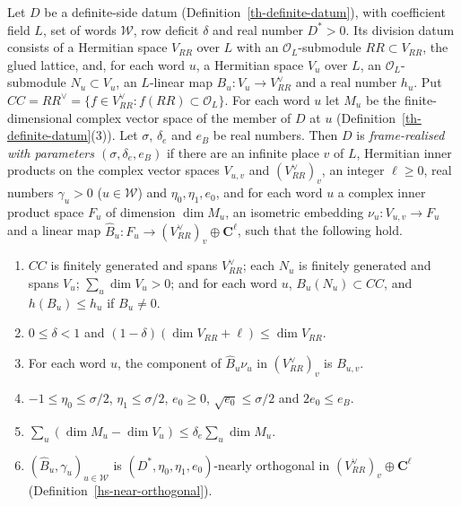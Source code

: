 \begin{definition}\label{hs-frame-realisation}
Let $D$ be a definite-side datum (Definition~\ref{th-definite-datum}), with coefficient field
$L$, set of words $\mathcal W$, row deficit $\delta$ and real number $D^*>0$. Its division
datum consists of a Hermitian space $V_{RR}$ over $L$ with an $\mathcal O_L$-submodule
$RR\subset V_{RR}$, the glued lattice, and, for each word $u$, a Hermitian space $V_u$ over $L$,
an $\mathcal O_L$-submodule $N_u\subset V_u$, an $L$-linear map $B_u:V_u\to V_{RR}^\vee$ and a
real number $h_u$. Put $CC=RR^\vee=\{f\in V_{RR}^\vee:f(RR)\subset\mathcal O_L\}$. For each word
$u$ let $M_u$ be the finite-dimensional complex vector space of the member of $D$ at $u$
(Definition~\ref{th-definite-datum}(3)). Let $\sigma$, $\delta_e$ and $e_B$ be real numbers. Then $D$ is
\emph{frame-realised with parameters $(\sigma,\delta_e,e_B)$} if there are an infinite place $v$
of $L$, Hermitian inner products on the complex vector spaces $V_{u,v}$ and $(V_{RR}^\vee)_v$, an
integer $\ell\geq0$, real numbers $\gamma_u>0$ ($u\in\mathcal W$) and $\eta_0,\eta_1,e_0$, and for
each word $u$ a complex inner product space $F_u$ of dimension $\dim M_u$, an isometric
embedding $\nu_u:V_{u,v}\to F_u$ and a linear map
$\hat B_u:F_u\to(V_{RR}^\vee)_v\oplus\mathbf C^\ell$, such that the following hold.
\begin{enumerate}
\item $CC$ is finitely generated and spans $V_{RR}^\vee$; each $N_u$ is finitely generated
  and spans $V_u$; $\sum_u\dim V_u>0$; and for each word $u$, $B_u(N_u)\subset CC$, and $h(B_u)\leq h_u$ if
  $B_u\neq0$.
\item $0\leq\delta<1$ and $(1-\delta)(\dim V_{RR}+\ell)\leq\dim V_{RR}$.
\item For each word $u$, the component of $\hat B_u\nu_u$ in $(V_{RR}^\vee)_v$ is $B_{u,v}$.
\item $-1\leq\eta_0\leq\sigma/2$, $\eta_1\leq\sigma/2$, $e_0\geq0$, $\sqrt{e_0}\leq\sigma/2$ and
  $2e_0\leq e_B$.
\item $\sum_u(\dim M_u-\dim V_u)\leq\delta_e\sum_u\dim M_u$.
\item $(\hat B_u,\gamma_u)_{u\in\mathcal W}$ is $(D^*,\eta_0,\eta_1,e_0)$-nearly orthogonal in
  $(V_{RR}^\vee)_v\oplus\mathbf C^\ell$ (Definition~\ref{hs-near-orthogonal}).
\end{enumerate}
\end{definition}


